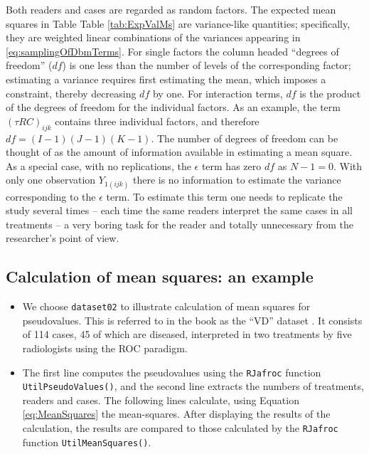 \documentclass[
]{book}
\begin{document}
Both readers and cases are regarded as random factors. The expected mean squares in Table Table \ref{tab:ExpValMs} are variance-like quantities; specifically, they are weighted linear combinations of the variances appearing in \eqref{eq:samplingOfDbmTerms}. For single factors the column headed ``degrees of freedom'' (\(df\)) is one less than the number of levels of the corresponding factor; estimating a variance requires first estimating the mean, which imposes a constraint, thereby decreasing \(df\) by one. For interaction terms, \(df\) is the product of the degrees of freedom for the individual factors. As an example, the term \((\tau RC)_{ijk}\) contains three individual factors, and therefore \(df = (I-1)(J-1)(K-1)\). The number of degrees of freedom can be thought of as the amount of information available in estimating a mean square. As a special case, with no replications, the \(\epsilon\) term has zero \(df\) as \(N-1 = 0\). With only one observation \(Y_{1(ijk)}\) there is no information to estimate the variance corresponding to the \(\epsilon\) term. To estimate this term one needs to replicate the study several times -- each time the same readers interpret the same cases in all treatments -- a very boring task for the reader and totally unnecessary from the researcher's point of view.

\hypertarget{calculation-of-mean-squares-an-example}{%
\subsection{Calculation of mean squares: an example}\label{calculation-of-mean-squares-an-example}}

\begin{itemize}
\item
  We choose \texttt{dataset02} to illustrate calculation of mean squares for pseudovalues. This is referred to in the book as the ``VD'' dataset \citep{RN1993}. It consists of 114 cases, 45 of which are diseased, interpreted in two treatments by five radiologists using the ROC paradigm.
\item
  The first line computes the pseudovalues using the \texttt{RJafroc} function \texttt{UtilPseudoValues()}, and the second line extracts the numbers of treatments, readers and cases. The following lines calculate, using Equation \eqref{eq:MeanSquares} the mean-squares. After displaying the results of the calculation, the results are compared to those calculated by the \texttt{RJafroc} function \texttt{UtilMeanSquares()}.
\end{itemize}
\end{document}
